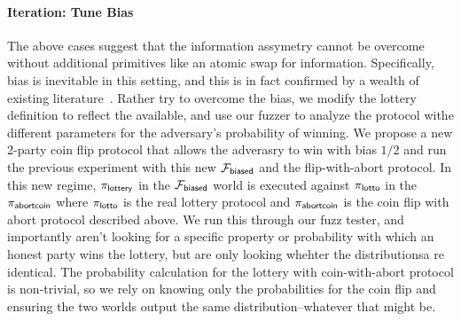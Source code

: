 \paragraph{Iteration: Tune Bias}
The above cases suggest that the information assymetry cannot be overcome
without additional primitives like an atomic swap for information.
Specifically, bias is inevitable in this setting, and this is in fact confirmed
by a wealth of existing literature~\cite{cleve1986limits, moran2016optimally}.
Rather try to overcome the bias, we modify the lottery definition to reflect
the available, and use our fuzzer to analyze the protocol withe different
parameters for the adversary's probability of winning.  We propose a new
2-party coin flip protocol that allows the adverasry to win with bias $1/2$ and
run the previous experiment with this new $\mathcal{F}_{{\mathsf {biased}}}$ and the
flip-with-abort protocol.  In this new regime, $\pi_{{\mathsf {lottery}}}$ in the
$\mathcal{F}_{{\mathsf {biased}}}$ world is executed against $\pi_{{\mathsf {lotto}}}$ in the
$\pi_{{\mathsf {abortcoin}}}$ where $\pi_{{\mathsf {lotto}}}$ is the real lottery protocol and
$\pi_{{\mathsf {abortcoin}}}$ is the coin flip with abort protocol described above.  We
run this through our fuzz tester, and importantly aren't looking for a specific
property or probability with which an honest party wins the lottery, but are
only looking whehter the distributionsa re identical.  The probability
calculation for the lottery with coin-with-abort protocol is non-trivial, so we
rely on knowing only the probabilities for the coin flip and ensuring the two
worlds output the same distribution--whatever that might be.



